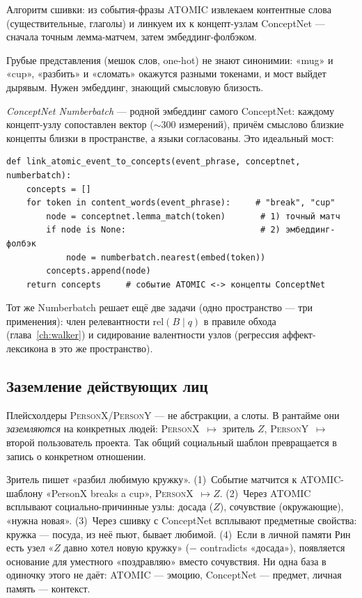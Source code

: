 Алгоритм сшивки: из события-фразы ATOMIC извлекаем контентные слова (существительные,
глаголы) и линкуем их к концепт-узлам ConceptNet — сначала точным лемма-матчем,
затем эмбеддинг-фолбэком.

\begin{pitfall}
Грубые представления (мешок слов, one-hot) не знают синонимии: «mug» и «cup»,
«разбить» и «сломать» окажутся разными токенами, и мост выйдет дырявым. Нужен
эмбеддинг, знающий смысловую близость.
\end{pitfall}

\emph{ConceptNet Numberbatch} — родной эмбеддинг самого ConceptNet: каждому
концепт-узлу сопоставлен вектор ($\sim$300 измерений), причём смыслово близкие
концепты близки в пространстве, а языки согласованы. Это идеальный мост:

\begin{lstlisting}[style=pseudo]
def link_atomic_event_to_concepts(event_phrase, conceptnet, numberbatch):
    concepts = []
    for token in content_words(event_phrase):     # "break", "cup"
        node = conceptnet.lemma_match(token)       # 1) точный матч
        if node is None:                           # 2) эмбеддинг-фолбэк
            node = numberbatch.nearest(embed(token))
        concepts.append(node)
    return concepts     # событие ATOMIC <-> концепты ConceptNet
\end{lstlisting}

Тот же Numberbatch решает ещё две задачи (одно пространство — три применения):
член релевантности $\text{rel}(B\mid q)$ в правиле обхода (глава~\ref{ch:walker}) и
сидирование валентности узлов (регрессия аффект-лексикона в это же пространство).

\subsection{Заземление действующих лиц}

Плейсхолдеры \textsc{PersonX}/\textsc{PersonY} — не абстракции, а слоты. В рантайме
они \emph{заземляются} на конкретных людей: \textsc{PersonX}~$\mapsto$ зритель $Z$,
\textsc{PersonY}~$\mapsto$ второй пользователь проекта. Так общий социальный шаблон
превращается в запись о конкретном отношении.

\begin{workedbox}
Зритель пишет «разбил любимую кружку». (1)~Событие матчится к ATOMIC-шаблону
«PersonX breaks a cup», \textsc{PersonX}~$\mapsto Z$. (2)~Через ATOMIC всплывают
социально-причинные узлы: досада ($Z$), сочувствие (окружающие), «нужна новая».
(3)~Через сшивку с ConceptNet всплывают предметные свойства: кружка — посуда, из
неё пьют, бывает любимой. (4)~Если в личной памяти Рин есть узел «$Z$ давно хотел
новую кружку» ($-$ contradicts «досада»), появляется основание для уместного
«поздравляю» вместо сочувствия. Ни одна база в одиночку этого не даёт: ATOMIC —
эмоцию, ConceptNet — предмет, личная память — контекст.
\end{workedbox}


